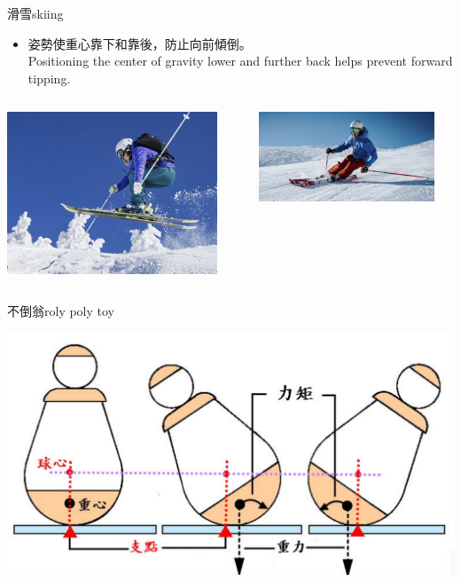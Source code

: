 \documentclass[beamer=true]{standalone}
\begin{document}
\begin{frame}{滑雪skiing}
    \begin{itemize}
        \item 姿勢使重心靠下和靠後，防止向前傾倒。\\Positioning the center of gravity lower and further back helps prevent forward tipping.
    \end{itemize}\bigskip
    \begin{columns}
        {\par\centering
            \includegraphics[width=0.9\textwidth]{assets/719dd84e.png}
            \par}
        {\par\centering
            \includegraphics[width=0.9\textwidth]{assets/8e0a1697.png}
            \par}
    \end{columns}


\end{frame}

\begin{frame}{不倒翁roly poly toy}
    \par
    {\par\centering
        \includegraphics[width=.8\textwidth]{assets/c2d6f451.png}
        \par}
\end{frame}
\end{document}
